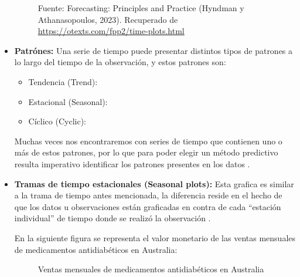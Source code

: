 \begin{itemize}
\begin{figure}[H]
        \begin{minipage}[t]{0.9\textwidth}
            Fuente: Forecasting: Principles and Practice (Hyndman y Athanasopoulos, 2023). Recuperado de \url{https://otexts.com/fpp2/time-plots.html}
        \end{minipage}
    \end{figure}
    
    \item \textbf{Patrónes:} Una serie de tiempo puede presentar distintos tipos de patrones a lo largo del tiempo de la observación, y estos patrones son:
        \begin{itemize}
            \item Tendencia (Trend):
            \item Estacional (Seasonal):
            \item Cíclico (Cyclic):
        \end{itemize}

        Muchas veces nos encontraremos con series de tiempo que contienen uno o más de estos patrones, por lo que para poder elegir un método predictivo resulta imperativo identificar los patrones presentes en los datos \cite{forecast-time-series-arima}.

    \item \textbf{Tramas de tiempo estacionales (Seasonal plots):} Esta grafica es similar a la trama de tiempo antes mencionada, la diferencia reside en el hecho de que los datos u observaciones están graficadas en contra de cada “estación individual” de tiempo donde se realizó la observación \cite{forecast-time-series-arima}.
    
        En la siguiente figura se representa el valor monetario de las ventas mensuales de medicamentos antidiabéticos en Australia:
        
        \begin{figure}[H]
            \begin{minipage}[t]{0.9\textwidth}
                \caption{Ventas mensuales de medicamentos antidiabéticos en Australia}
                \label{seasonalplot}        
            \end{minipage}
        
            \vspace{10pt}
        

\end{figure}
\end{itemize}
